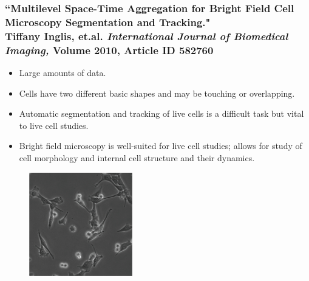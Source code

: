 \documentclass[8pt]{beamer}
\begin{document}
\begin{frame}
\frametitle{``Multilevel Space-Time Aggregation for Bright Field Cell Microscopy Segmentation and Tracking." \\ { \small Tiffany Inglis, et.al. \textit{International Journal of Biomedical Imaging,} Volume 2010, Article ID 582760}
 }
\begin{itemize}
\item Large amounts of data.
\item Cells have two different basic shapes and may be touching or overlapping.
\item Automatic segmentation and tracking of live cells is a difficult task but vital to live cell studies.
\item Bright field microscopy is well-suited for live cell studies; allows for study of cell morphology and internal cell structure and their dynamics.
\end{itemize}

\begin{figure}
\centering
\includegraphics[width=0.4\textwidth,height=0.4\textwidth]{cells.png} \hspace{.45cm}
\end{figure}
\end{frame}
\end{document}
